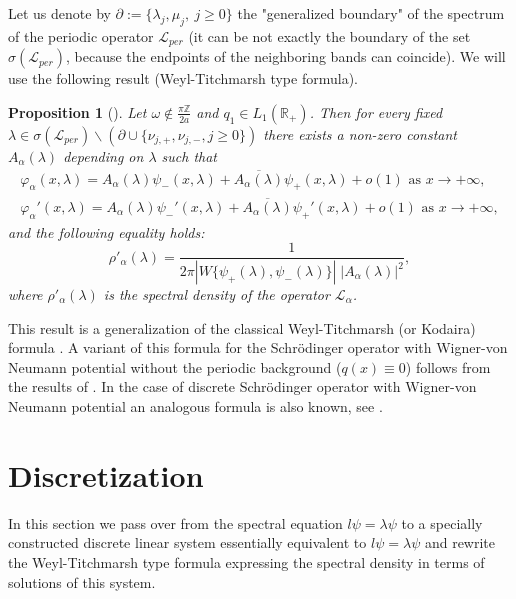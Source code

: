 \documentclass[a4paper,oneside,12pt]{amsart}
\newtheorem{prop}{Proposition}
\begin{document}
Let us denote by $\partial:=\{\lambda_j,\mu_j,\ j\ge0\}$ the "generalized boundary" of
the spectrum of the periodic operator $\mathcal L_{per}$ (it can be not exactly the boundary of the set $\sigma(\mathcal L_{per})$, because the endpoints of the neighboring bands can coincide). We will use the following result (Weyl-Titchmarsh type formula).

    \begin{prop}[\cite{Kurasov-Simonov-2011}]\label{prop Weyl-Titchmarsh type formula}
    Let $\omega\notin\frac{\pi\mathbb Z}{2a}$ and $q_1\in L_1(\mathbb R_+)$. Then for every fixed
    \linebreak
    $\lambda\in\sigma(\mathcal L_{per})\backslash(\partial\cup\{\nu_{j,+},\nu_{j,-},j\ge0\})$ there exists a non-zero constant $A_{\alpha}(\lambda)$ depending on $\lambda$ such that
    \begin{equation}\label{asymptotics of phi-alpha}
    \begin{array}{l}
        \varphi_{\alpha}(x,\lambda)=A_{\alpha}(\lambda)\psi_-(x,\lambda)+
        \overline{A_{\alpha}(\lambda)}\psi_+(x,\lambda)+o(1)\text{ as }x\rightarrow+\infty,
        \\
        \varphi_{\alpha}'(x,\lambda)=A_{\alpha}(\lambda)\psi_-'(x,\lambda)+
        \overline{A_{\alpha}(\lambda)}\psi_+'(x,\lambda)+o(1)\text{ as }x\rightarrow+\infty,
    \end{array}
    \end{equation}
    and the following equality holds:
    \begin{equation}\label{Weyl-Titchmatsh type formula phi}
        \rho'_{\alpha}(\lambda)=\frac1{2\pi|W\{\psi_+(\lambda),\psi_-(\lambda)\}| \; |A_{\alpha}(\lambda)|^2},
    \end{equation}
    where $\rho'_{\alpha}(\lambda)$ is the spectral density of the operator $\mathcal L_{\alpha}$.
    \end{prop}

This result is a generalization of the classical Weyl-Titchmarsh (or Kodaira) formula \cite{Titchmarsh-1946-2,Kodaira-1949}. A variant of this formula for the Schr\"odinger operator with Wigner-von Neumann potential without the periodic background ($q(x)\equiv0$) follows from the results of \cite{Matveev-1973,Brown-Eastham-McCormack-1998}. In the case of discrete Schr\"odinger operator with Wigner-von Neumann potential an analogous formula is also known, see \cite{Damanik-Simon-2006,Janas-Simonov-2010}.

\section{Discretization}\label{section discretization}
In this section we pass over from the spectral equation $l\psi=\lambda\psi$ to a specially constructed discrete linear system essentially equivalent to $l\psi=\lambda\psi$ and rewrite the Weyl-Titchmarsh type formula expressing the spectral density in terms of solutions of this system.
\end{document}
